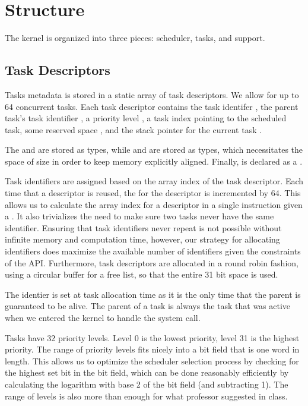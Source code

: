 \documentclass[pdftex,10pt,a4paper]{article}
\begin{document}
\newpage
\section*{Structure}

The kernel is organized into three pieces: scheduler, tasks, and
support.

\subsection*{Task Descriptors}

Tasks metadata is stored in a static array of task descriptors. We
allow for up to 64 concurrent tasks. Each task descriptor contains the
task identifer , the parent task's task identifier
, a priority level , a task index pointing
to the  scheduled task, some reserved space ,
and the stack pointer for the current task .

The  and  are stored as  types, while 
and  are stored as  types, which
necessitates the  space of size  in order to keep memory explicitly aligned. Finally, 
is declared as a .

Task identifiers are assigned based on the array index of the task
descriptor. Each time that a descriptor is reused, the  for
the descriptor is incremented by 64. This allows us to calculate the
array index for a descriptor in a single instruction given a
. It also trivializes the need to make sure two tasks never
have the same identifier. Ensuring that task identifiers never repeat
is not possible without infinite memory and computation time, however,
our strategy for allocating identifiers does maximize the available
number of identifiers given the constraints of the API. Furthermore,
task descriptors are allocated in a round robin fashion, using a
circular buffer for a free list, so that the entire 31 bit space is used.

The  identier is set at task allocation time as it is the
only time that the parent is guaranteed to be alive. The parent of a
task is always the task that was active when we entered the kernel to
handle the system call.

Tasks have 32 priority levels. Level 0 is the lowest priority, level
31 is the highest priority. The range of priority levels fits nicely
into a bit field that is one word in length. This allows us to
optimize the scheduler selection process by checking for the highest
set bit in the bit field, which can be done reasonably efficiently by
calculating the logarithm with base 2 of the bit field (and
subtracting 1). The range of levels is also more than enough for what
professor suggested in class.
\end{document}
